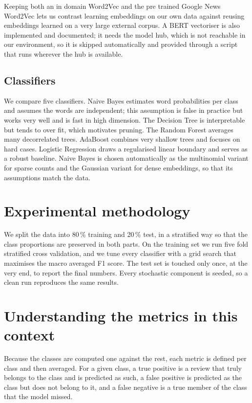 \documentclass[11pt,a4paper]{article}
\begin{document}
Keeping both an in domain Word2Vec and the pre trained Google News Word2Vec lets us
contrast learning embeddings on our own data against reusing embeddings learned on a
very large external corpus. A BERT vectoriser is also implemented and documented; it
needs the model hub, which is not reachable in our environment, so it is skipped
automatically and provided through a script that runs wherever the hub is available.

\subsection{Classifiers}
We compare five classifiers. Naive Bayes estimates word probabilities per class and
assumes the words are independent; this assumption is false in practice but works
very well and is fast in high dimension. The Decision Tree is interpretable but tends
to over fit, which motivates pruning. The Random Forest averages many decorrelated
trees. AdaBoost combines very shallow trees and focuses on hard cases. Logistic
Regression draws a regularised linear boundary and serves as a robust baseline. Naive
Bayes is chosen automatically as the multinomial variant for sparse counts and the
Gaussian variant for dense embeddings, so that its assumptions match the data.

\section{Experimental methodology}
We split the data into 80\,\% training and 20\,\% test, in a stratified way so that
the class proportions are preserved in both parts. On the training set we run five
fold stratified cross validation, and we tune every classifier with a grid search
that maximises the macro averaged F1 score. The test set is touched only once, at the
very end, to report the final numbers. Every stochastic component is seeded, so a
clean run reproduces the same results.

\section{Understanding the metrics in this context}
Because the classes are computed one against the rest, each metric is defined per
class and then averaged. For a given class, a true positive is a review that truly
belongs to the class and is predicted as such, a false positive is predicted as the
class but does not belong to it, and a false negative is a true member of the class
that the model missed.
\end{document}
